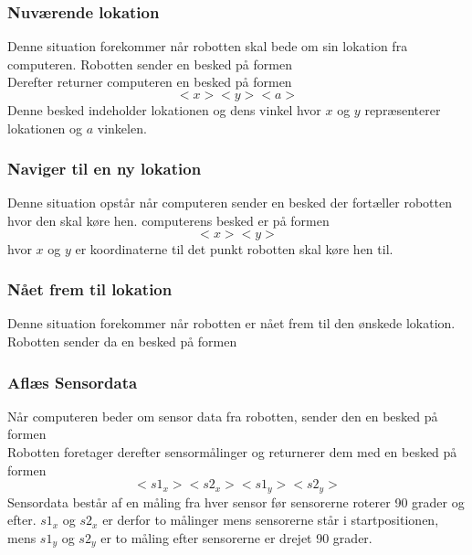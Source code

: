 \subsubsection{Nuværende lokation}\label{protokol:positur}
Denne situation forekommer når robotten skal bede om sin lokation fra computeren.
Robotten sender en besked på formen
\[<0>\]
Derefter returner computeren en besked på formen
\[<52><x><y><a>\]
Denne besked indeholder lokationen og dens vinkel hvor $x$ og $y$ repræsenterer lokationen og $a$ vinkelen.

\subsubsection{Naviger til en ny lokation}\label{design:protokol_navigertilny}
Denne situation opstår når computeren sender en besked der fortæller robotten hvor den skal køre hen.
computerens besked er på formen
 \[<50><x><y>\] 
hvor $x$ og $y$ er koordinaterne til det punkt robotten skal køre hen til.

\subsubsection{Nået frem til lokation}
Denne situation forekommer når robotten er nået frem til den ønskede lokation.
Robotten sender da en besked på formen \[<1>\]

\subsubsection{Aflæs Sensordata}
Når computeren beder om sensor data fra robotten, sender den en besked på formen \[<51>\]
Robotten foretager derefter sensormålinger og returnerer dem med en besked på formen  
\[<2><s1_x> <s2_x> <s1_y> <s2_y>\]
Sensordata består af en måling fra hver sensor før sensorerne roterer 90 grader og efter.
$ s1_x $ og $ s2_x $ er derfor to målinger mens sensorerne står i startpositionen, mens $ s1_y $ og $ s2_y $ er to måling efter sensorerne er drejet 90 grader.